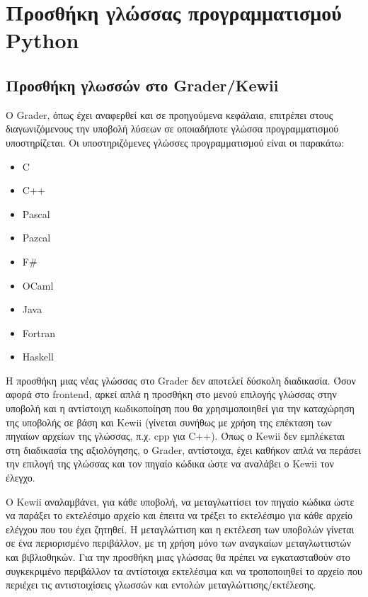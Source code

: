 \documentclass[diploma]{softlab-thesis}
\begin{document}
\section{Προσθήκη γλώσσας προγραμματισμού Python}

\subsection{Προσθήκη γλωσσών στο Grader/Kewii}

Ο Grader, όπως έχει αναφερθεί και σε προηγούμενα κεφάλαια, επιτρέπει στους
διαγωνιζόμενους την υποβολή λύσεων σε οποιαδήποτε γλώσσα προγραμματισμού
υποστηρίζεται. Οι υποστηριζόμενες γλώσσες προγραμματισμού είναι οι παρακάτω:

\begin{itemize}
    \setlength\itemsep{0em}
    \item C
    \item C++
    \item Pascal
    \item Pazcal
    \item F\#
    \item OCaml
    \item Java
    \item Fortran
    \item Haskell
\end{itemize}

\bigskip

Η προσθήκη μιας νέας γλώσσας στο Grader δεν αποτελεί δύσκολη διαδικασία. Όσον
αφορά στο frontend, αρκεί απλά η προσθήκη στο μενού επιλογής γλώσσας στην
υποβολή και η αντίστοιχη κωδικοποίηση που θα χρησιμοποιηθεί για την καταχώρηση
της υποβολής σε βάση και Kewii (γίνεται συνήθως με χρήση της επέκταση των
πηγαίων αρχείων της γλώσσας, π.χ. cpp για C++). Όπως ο Kewii δεν εμπλέκεται
στη διαδικασία της αξιολόγησης, ο Grader, αντίστοιχα, έχει καθήκον απλά να
περάσει την επιλογή της γλώσσας και τον πηγαίο κώδικα ώστε να αναλάβει ο Kewii
τον έλεγχο.

\bigskip

Ο Kewii αναλαμβάνει, για κάθε υποβολή, να μεταγλωττίσει τον πηγαίο κώδικα ώστε
να παράξει το εκτελέσιμο αρχείο και έπειτα να τρέξει το εκτελέσιμο για κάθε
αρχείο ελέγχου που του έχει ζητηθεί. Η μεταγλώττιση και η εκτέλεση των υποβολών
γίνεται σε ένα περιορισμένο περιβάλλον, με τη χρήση μόνο των αναγκαίων
μεταγλωττιστών και βιβλιοθηκών. Για την προσθήκη μιας γλώσσας θα πρέπει να
εγκατασταθούν στο συγκεκριμένο περιβάλλον τα αντίστοιχα εκτελέσιμα και να
τροποποιηθεί το αρχείο που περιέχει τις αντιστοιχίσεις γλωσσών και εντολών
μεταγλώττισης/εκτέλεσης.
\end{document}
